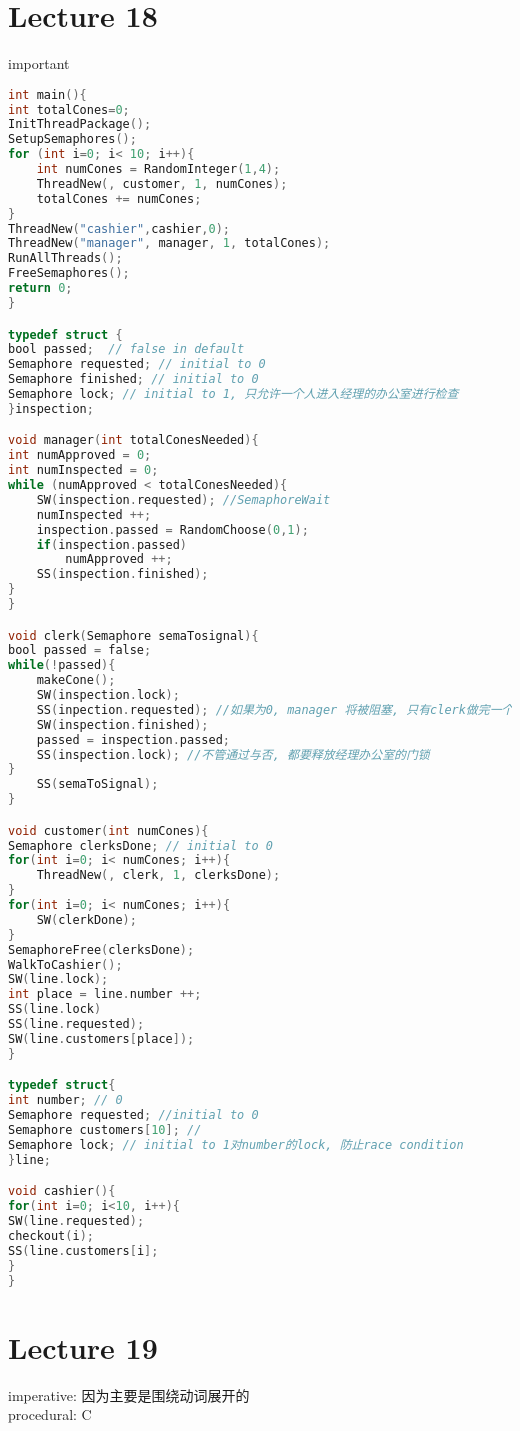 \documentclass{article}
\begin{document}
\section{Lecture 18} important
\begin{lstlisting}[language = C]
int main(){
int totalCones=0;
InitThreadPackage();
SetupSemaphores();
for (int i=0; i< 10; i++){
	int numCones = RandomInteger(1,4);
	ThreadNew(, customer, 1, numCones);
	totalCones += numCones;
}
ThreadNew("cashier",cashier,0);
ThreadNew("manager", manager, 1, totalCones);
RunAllThreads();
FreeSemaphores();
return 0;
}

typedef struct {
bool passed;  // false in default
Semaphore requested; // initial to 0
Semaphore finished; // initial to 0
Semaphore lock; // initial to 1, 只允许一个人进入经理的办公室进行检查
}inspection;

void manager(int totalConesNeeded){
int numApproved = 0;
int numInspected = 0;
while (numApproved < totalConesNeeded){
	SW(inspection.requested); //SemaphoreWait
	numInspected ++;
	inspection.passed = RandomChoose(0,1);
	if(inspection.passed)
		numApproved ++;
	SS(inspection.finished);
}
}

void clerk(Semaphore semaTosignal){
bool passed = false;
while(!passed){
	makeCone();
	SW(inspection.lock);
	SS(inpection.requested); //如果为0, manager 将被阻塞, 只有clerk做完一个cone, 并且进入经理的办公室,但是这里有一个疑问, 既然已经进入了经理的办公室, 那说明里面没有其他的clerk, 应该说经理可以直接检查, 为什么还需要requeseted 这个信号量呢?
	SW(inspection.finished);
	passed = inspection.passed;
	SS(inspection.lock); //不管通过与否, 都要释放经理办公室的门锁
}
	SS(semaToSignal);
}

void customer(int numCones){
Semaphore clerksDone; // initial to 0
for(int i=0; i< numCones; i++){
	ThreadNew(, clerk, 1, clerksDone);	
}
for(int i=0; i< numCones; i++){
	SW(clerkDone);
}
SemaphoreFree(clerksDone);
WalkToCashier();
SW(line.lock);
int place = line.number ++;
SS(line.lock)
SS(line.requested);
SW(line.customers[place]);
}

typedef struct{
int number; // 0
Semaphore requested; //initial to 0
Semaphore customers[10]; //
Semaphore lock; // initial to 1对number的lock, 防止race condition
}line;

void cashier(){
for(int i=0; i<10, i++){
SW(line.requested);
checkout(i);
SS(line.customers[i];
}
}
\end{lstlisting}

\section{Lecture 19}
imperative: 因为主要是围绕动词展开的\\
procedural:
C
\end{document}
